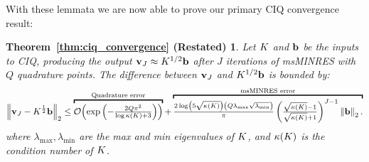 






With these lemmata we are now able to prove our primary CIQ convergence result:
%
\newtheorem*{ciq_convergence}{Theorem~\ref{thm:ciq_convergence} (Restated)}
\begin{ciq_convergence}
  Let $K$ and $\mathbf{b}$ be the inputs to CIQ, producing the output $\mathbf{v}_J \approx K^{1/2} \mathbf{b}$ after $J$ iterations of msMINRES with $Q$ quadrature points.
  The difference between $\mathbf{v}_J$ and $K^{1/2} \mathbf{b}$ is bounded by:
  \begin{equation*}
    \left\Vert \bv_J - \bK^{\frac 1 2} \bb \right\Vert_2
    \leq
    \overbracket{
      \bigo{\exp\left( -\tfrac  {2 Q \pi^2}{\log \kappa(\bK) + 3} \right)}
    }^{\text{Quadrature error}}
    +
    \overbracket{
      \tfrac{ 2 \log \left( 5 \sqrt{\kappa(\bK)} \right)  \left( Q \lambda_\text{max} \sqrt{\lambda_\text{min}} \right) }{\pi}
      \left( \tfrac{ \sqrt{\kappa(\bK)} - 1}{ \sqrt{\kappa(\bK)} + 1} \right)^{J-1}
      \left\Vert \bb \right\Vert_2.
    }^{\text{msMINRES error}}
  \end{equation*}
  where $\lambda_\text{max},\lambda_{\text{min}}$ are the max and min eigenvalues of $K$, and $\kappa(K)$ is the condition number of $K$.
\end{ciq_convergence}
%
